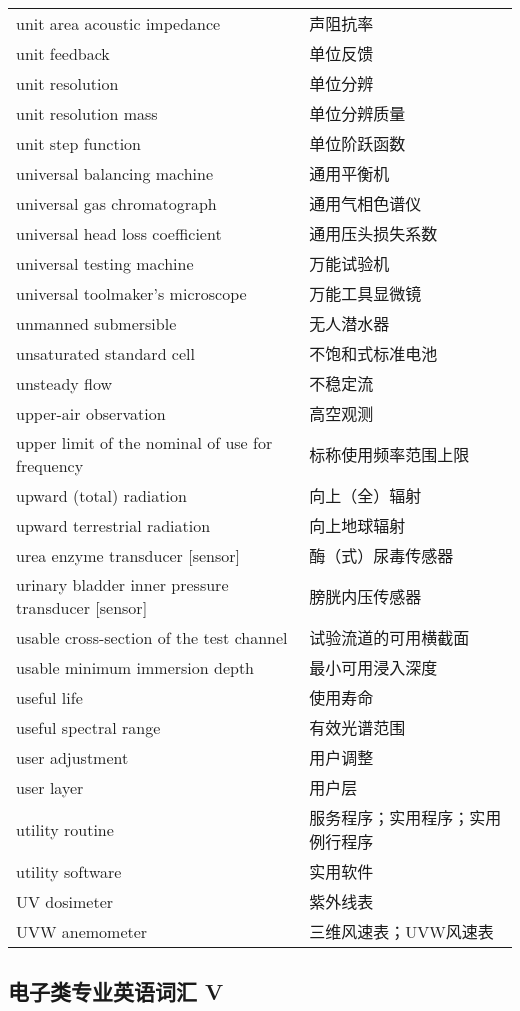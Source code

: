 \documentclass[
]{article}
\begin{document}
\begin{longtable}[]{@{}ll@{}}
unit area acoustic impedance & 声阻抗率 \\
unit feedback & 单位反馈 \\
unit resolution & 单位分辨 \\
unit resolution mass & 单位分辨质量 \\
unit step function & 单位阶跃函数 \\
universal balancing machine & 通用平衡机 \\
universal gas chromatograph & 通用气相色谱仪 \\
universal head loss coefficient & 通用压头损失系数 \\
universal testing machine & 万能试验机 \\
universal toolmaker's microscope & 万能工具显微镜 \\
unmanned submersible & 无人潜水器 \\
unsaturated standard cell & 不饱和式标准电池 \\
unsteady flow & 不稳定流 \\
upper-air observation & 高空观测 \\
upper limit of the nominal of use for frequency &
标称使用频率范围上限 \\
upward (total) radiation & 向上（全）辐射 \\
upward terrestrial radiation & 向上地球辐射 \\
urea enzyme transducer {[}sensor{]} & 酶（式）尿毒传感器 \\
urinary bladder inner pressure transducer {[}sensor{]} &
膀胱内压传感器 \\
usable cross-section of the test channel & 试验流道的可用横截面 \\
usable minimum immersion depth & 最小可用浸入深度 \\
useful life & 使用寿命 \\
useful spectral range & 有效光谱范围 \\
user adjustment & 用户调整 \\
user layer & 用户层 \\
utility routine & 服务程序；实用程序；实用例行程序 \\
utility software & 实用软件 \\
UV dosimeter & 紫外线表 \\
UVW anemometer & 三维风速表；UVW风速表 \\
\bottomrule()
\end{longtable}

\hypertarget{ux7535ux5b50ux7c7bux4e13ux4e1aux82f1ux8bedux8bcdux6c47-v}{%
\subsection{\texorpdfstring{电子类专业英语词汇 V
}{电子类专业英语词汇 V }}\label{ux7535ux5b50ux7c7bux4e13ux4e1aux82f1ux8bedux8bcdux6c47-v}}
\end{document}

